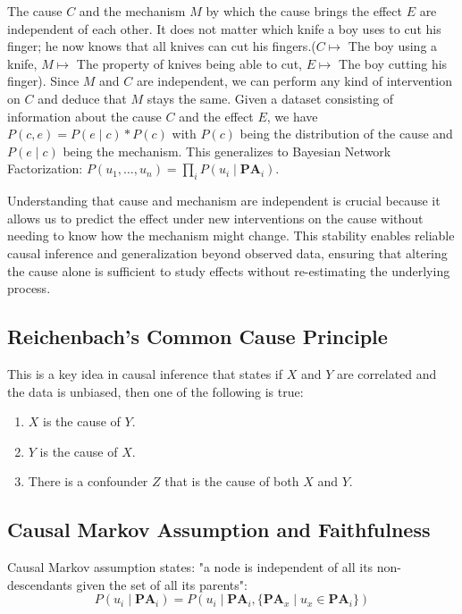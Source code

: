 \documentclass{article}
\begin{document}
	The cause $C$ and the mechanism $M$ by which the cause brings the effect $E$ are independent of each other. It does not matter which knife a boy uses to cut his finger; he now knows that all knives can cut his fingers.($C \mapsto$ The boy using a knife,
	$M \mapsto$ The property of knives being able to cut,
	$E \mapsto$ The boy cutting his finger). Since $M$ and $C$ are independent, we can perform any kind of intervention on $C$ and deduce that $M$ stays the same. Given a dataset consisting of information about the cause $C$ and the effect $E$, we have $P(c, e) = P(e \mid c) * P(c)$ with $P(c)$ being the distribution of the cause and $P(e \mid c)$ being the mechanism. This generalizes to Bayesian Network Factorization: $P(u_1, \dots, u_n) = \prod \limits_{i} P(u_i \mid \mathbf{PA}_i)$.
	
	Understanding that cause and mechanism are independent is crucial because it allows us to predict the effect under new interventions on the cause without needing to know how the mechanism might change. This stability enables reliable causal inference and generalization beyond observed data, ensuring that altering the cause alone is sufficient to study effects without re-estimating the underlying process. 
	
	\subsection{Reichenbach's Common Cause Principle}
	
	This is a key idea in causal inference that states if $X$ and $Y$ are correlated and the data is unbiased, then one of the following is true:
	
	\begin{enumerate}
		\item $X$ is the cause of $Y$.
		\item $Y$ is the cause of $X$.
		\item There is a confounder $Z$ that is the cause of both $X$ and $Y$.
	\end{enumerate}
	
	\subsection*{Causal Markov Assumption and Faithfulness}
	
	Causal Markov assumption states: "a node is independent of all its non-descendants given the set of all its parents": $$P(u_i \mid \mathbf{PA}_i) = P(u_i \mid \mathbf{PA}_i, \{\mathbf{PA}_x \mid u_x \in \mathbf{PA}_i\})$$
	
\end{document}
